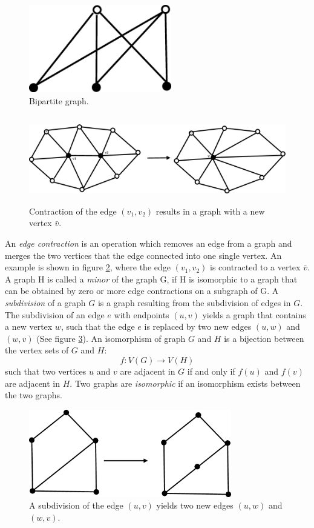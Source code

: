 \begin{figure}
	\centering
\includegraphics[height=1.5in]{fig2.eps}
\caption{Bipartite graph.}
\label{fig2}
\end{figure}

\begin{figure}
	\centering
\includegraphics[height=1.5in]{contract.eps}
\caption{Contraction of the edge $(v_1, v_2)$ results in a graph with a new vertex $\bar{v}$.}
\label{contract}
\end{figure} 

An \emph{edge contraction} is an operation which removes an edge from a graph and merges the two vertices that the edge connected into one single vertex. An example is shown in figure \ref{contract}, where the edge $(v_1, v_2)$ is contracted to a vertex $\bar{v}$. A graph H is called a \emph{minor} of the graph G, if H is isomorphic to a graph that can be obtained by zero or more edge contractions on a subgraph of G. A \emph{subdivision} of a graph $G$ is a graph resulting from the subdivision of edges in $G$. The subdivision of an edge $e$ with endpoints $(u,v)$ yields a graph that contains a new vertex $w$, such that the edge $e$ is replaced by two new edges $(u,w)$ and $(w,v)$ (See figure \ref{subdivision}). An isomorphism of graph $G$ and $H$ is a bijection between the vertex sets of $G$ and $H$:
$$f:V(G) \rightarrow V(H)$$
such that two vertices $u$ and $v$ are adjacent in $G$ if and only if $f(u)$ and $f(v)$ are adjacent in $H$. Two graphs are \emph{isomorphic} if an isomorphism exists between the two graphs. 

\begin{figure}
	\centering
\includegraphics[height=1.5in]{subdivision.eps}
\caption{A subdivision of the edge $(u,v)$ yields two new edges $(u,w)$ and $(w,v)$.}
\label{subdivision}
\end{figure} 

